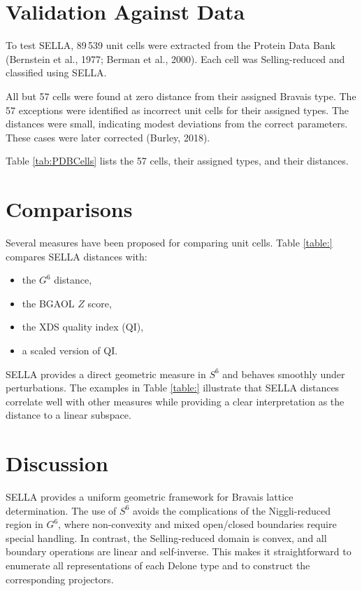 \documentclass[preprint]{iucr}              %
\begin{document}
	\section{Validation Against Data}
	
	To test SELLA, 89\,539 unit cells were extracted from the Protein Data Bank
	(Bernstein et al., 1977; Berman et al., 2000). Each cell was Selling-reduced
	and classified using SELLA.
	
	All but 57 cells were found at zero distance from their assigned Bravais type.
	The 57 exceptions were identified as incorrect unit cells for their assigned
	types. The distances were small, indicating modest deviations from the correct
	parameters. These cases were later corrected (Burley, 2018).
	
	Table \ref{tab:PDBCells} lists the 57 cells, their assigned types, and their distances.
	
	\section{Comparisons}
	
	Several measures have been proposed for comparing unit cells. Table \ref{table:} compares
	SELLA distances with:
	
	\begin{itemize}
		\item the $G^6$ distance,
		\item the BGAOL $Z$ score,
		\item the XDS quality index (QI),
		\item a scaled version of QI.
	\end{itemize}
	
	SELLA provides a direct geometric measure in $S^6$ and behaves smoothly under
	perturbations. The examples in Table \ref{table:} illustrate that SELLA distances correlate
	well with other measures while providing a clear interpretation as the distance
	to a linear subspace.
	
	
	\section{Discussion}
	
	SELLA provides a uniform geometric framework for Bravais lattice
	determination. The use of $S^6$ avoids the complications of the Niggli-reduced
	region in $G^6$, where non-convexity and mixed open/closed boundaries require
	special handling. In contrast, the Selling-reduced domain is convex, and all
	boundary operations are linear and self-inverse. This makes it straightforward
	to enumerate all representations of each Delone type and to construct the
	corresponding projectors.
	
\end{document}
